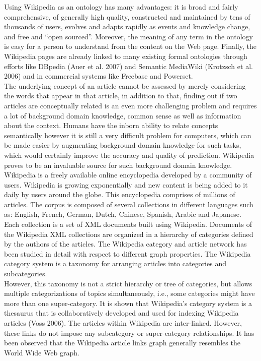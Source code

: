 Using Wikipedia as an ontology has many advantages: it is broad and fairly comprehensive, of generally high quality, constructed and maintained by tens of thousands of users, evolves and adapts rapidly as events and knowledge change, and free and “open sourced”. Moreover, the meaning of any term in the ontology is easy for a person to understand from the content on the Web page. Finally, the Wikipedia pages are already linked to many existing formal ontologies through efforts like DBpedia (Auer et al. 2007) and Semantic MediaWiki (Krotzsch et al. 2006) and in commercial systems like Freebase and Powerset.\\
The underlying concept of an article cannot be assessed by merely considering the words that appear in that article, in addition to that, finding out if two articles are conceptually related is an even more challenging problem and requires a lot of background domain knowledge, common sense as well as information about the context. Humans have the inborn ability to relate concepts semantically however it is still a very difficult problem for computers, which can be made easier by augmenting background domain knowledge for such tasks, which would certainly improve the accuracy and quality of prediction. Wikipedia proves to be an invaluable source for such background domain knowledge.\\

Wikipedia is a freely available online encyclopedia developed by a community of users. Wikipedia is growing exponentially and new content is being added to it daily by users around the globe. This encyclopedia comprises of millions of articles. The corpus is composed of several collections in different languages such as: English, French, German, Dutch, Chinese, Spanish, Arabic and Japanese. \\
Each collection is a set of XML documents built using Wikipedia. Documents of the Wikipedia XML collections are organized in a hierarchy of categories defined by the authors of the articles. The Wikipedia category and article network has been studied in detail with respect to different graph properties. The Wikipedia category system is a taxonomy for arranging articles into categories and subcategories.\\
However, this taxonomy is not a strict hierarchy or tree of categories, but allows multiple categorizations of topics simultaneously, i.e., some categories might have more than one super-category. It is shown that Wikipedia’s category system is a thesaurus that is collaboratively developed and used for indexing Wikipedia articles (Voss 2006). The articles within Wikipedia are inter-linked. However, these links do not impose any subcategory or super-category relationships. It has been observed that the Wikipedia article links graph generally resembles the World Wide Web graph.\\

